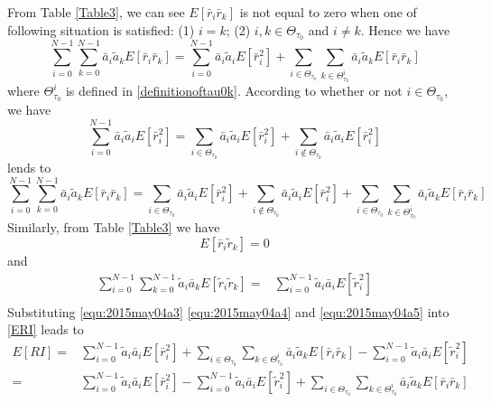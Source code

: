  From Table \ref{Table3}, we can see $E[\bar{r}_i\bar{r}_k]$ is not equal to zero when one of following situation is satisfied: (1) $i = k$; (2) $i, k \in \Theta_{\tau_0}$ and $i \neq k$. Hence we have 
 \[
\sum_{i=0}^{N-1}\sum_{k=0}^{N-1}\bar{a}_i\tilde{a}_kE[\bar{r}_i\bar{r}_k] = 
\sum_{i=0}^{N-1}\bar{a}_i\tilde{a}_iE[\bar{r}_i^2] + \sum_{i\in\Theta_{\tau_0}}\sum_{k\in\Theta_{\tau_0}^i}\bar{a}_i\tilde{a}_kE[\bar{r}_i\bar{r}_k]
 \]
 where $\Theta_{\tau_0}^i$ is defined in \eqref{definitionoftau0k}. 
 According to whether or not $i \in \Theta_{\tau_0}$, we have  
 \[
   \sum_{i=0}^{N-1}\bar{a}_i\tilde{a}_iE[\bar{r}_i^2]=
   \sum_{i\in\Theta_{\tau_0}}\bar{a}_i\tilde{a}_iE[\bar{r}_i^2] + \sum_{i\notin\Theta_{\tau_0}}\bar{a}_i\tilde{a}_iE[\bar{r}_i^2]
 \]
lends to 
\begin{equation}
\sum_{i=0}^{N-1}\sum_{k=0}^{N-1}\bar{a}_i\tilde{a}_kE[\bar{r}_i\bar{r}_k] = 
   \sum_{i\in\Theta_{\tau_0}}\bar{a}_i\tilde{a}_iE[\bar{r}_i^2] + \sum_{i\notin\Theta_{\tau_0}}\bar{a}_i\tilde{a}_iE[\bar{r}_i^2]
+ \sum_{i\in\Theta_{\tau_0}}\sum_{k\in\Theta_{\tau_0}^i}\bar{a}_i\tilde{a}_kE[\bar{r}_i\bar{r}_k]
  \label{equ:2015may04a3}
\end{equation}
Similarly, from Table \ref{Table3} we have
 \begin{equation}
   E[\bar{r}_i\tilde{r}_k]= 0 
   \label{equ:2015may04a4}
 \end{equation}
and
\begin{equation}
  \begin{split}
    \sum_{i=0}^{N-1}\sum_{k=0}^{N-1}\tilde{a}_i\bar{a}_kE[\tilde{r}_i\tilde{r}_k]  =&  \sum_{i=0}^{N-1}\tilde{a}_i\bar{a}_iE[\tilde{r}_i^2]\\
  \end{split}
  \label{equ:2015may04a5}
\end{equation}
Substituting \eqref{equ:2015may04a3} \eqref{equ:2015may04a4} and \eqref{equ:2015may04a5} into \eqref{ERI} leads to  
 \begin{equation}
   \begin{split}
     E[RI] = &\sum_{i=0}^{N-1}\tilde{a}_i\bar{a}_iE[\bar{r}_i^2]  + \sum_{i\in\Theta_{\tau_0}}\sum_{k\in\Theta_{\tau_0}^i}\bar{a}_i\tilde{a}_kE[\bar{r}_i\bar{r}_k] - \sum_{i=0}^{N-1}\tilde{a}_i\bar{a}_iE[\tilde{r}_i^2]\\
     = &\sum_{i=0}^{N-1}\tilde{a}_i\bar{a}_iE[\bar{r}_i^2] - \sum_{i=0}^{N-1}\tilde{a}_i\bar{a}_iE[\tilde{r}_i^2] + \sum_{i\in\Theta_{\tau_0}}\sum_{k\in\Theta_{\tau_0}^i}\bar{a}_i\tilde{a}_kE[\bar{r}_i\bar{r}_k]
    \label{2015apr27a1}
   \end{split}
 \end{equation}
